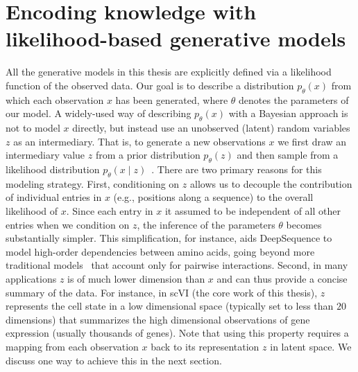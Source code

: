 \section{Encoding knowledge with likelihood-based generative models} 
\label{subsec:encoding_likelihood}
All the generative models in this thesis are explicitly defined via a likelihood function of the observed data. Our goal is to describe a distribution $p_{\theta}(x)$ from which each observation $x$ has been generated, where $\theta$ denotes the parameters of our model. A widely-used way of describing $p_\theta(x)$ with a Bayesian approach is not to model $x$ directly, but instead use an unobserved (latent) random variables $z$ as an intermediary. That is, to generate a new observations $x$ we first draw an intermediary value $z$ from a prior distribution $p_\theta(z)$ and then sample from a likelihood distribution $p_\theta(x\mid z)$~\cite{Wainwright:2008:GME:1498840.1498841}. There are two primary reasons for this modeling strategy. First, conditioning on $z$ allows us to decouple the contribution of individual entries in $x$ (e.g., positions along a sequence) to the overall likelihood of $x$. Since each entry in $x$ it assumed to be independent of all other entries when we condition on $z$, the inference of the parameters $\theta$ becomes substantially simpler. This simplification, for instance, aids DeepSequence to model high-order dependencies between amino acids, going beyond more traditional models~\cite{hopf2017mutation} that account only for pairwise interactions. Second, in many applications $z$ is of much lower dimension than $x$ and can thus provide a concise summary of the data. For instance, in scVI (the core work of this thesis), $z$ represents the cell state in a low dimensional space (typically set to less than $20$ dimensions) that summarizes the high dimensional observations of gene expression (usually thousands of genes). Note that using this property requires a mapping from each observation $x$ back to its representation $z$ in latent space. We discuss one way to achieve this in the next section.

